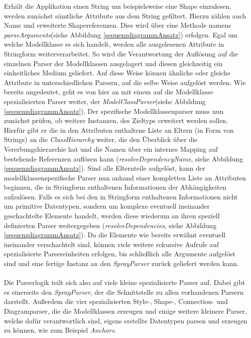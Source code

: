 \begin{figure}[htb]
\end{figure}Erhält die Applikation einen String um beispielsweise eine Shape einzulesen, werden zunächst sämtliche Attribute aus dem String gefiltert. Hierzu zählen auch Name und erweiterte Shapereferenzen. Dies wird über eine Methode namens \textit{parseArguments}(siehe Abbildung \ref{sequenzdiagrammAnsatz}) erfolgen. Egal um welche Modellklasse es sich handelt, werden alle ausgelesenen Attribute in Stringform weiterverarbeitet. So wird die Verantwortung der Auflösung auf die einzelnen Parser der Modellklassen ausgelagert und diesen gleichzeitig ein einheitliches Medium geliefert. Auf diese Weise können ähnliche oder gleiche Attribute in unterschiedlichen Parsern, auf die selbe Weise aufgelöst werden. Wie bereits angedeutet, geht es von hier an mit einem auf die Modellklasse spezialisierten Parser weiter, der \textit{ModelClassParser}(siehe Abbildung \ref{sequenzdiagrammAnsatz}). Der spezifische Modellklassenparser muss nun zunächst prüfen, ob weitere Instanzen, des Zieltyps erweitert werden sollen. Hierfür gibt er die in den Attributen enthaltene Liste an Eltern (in Form von Strings) an die \textit{ClassHierarchy} weiter, die den Überblick über die Vererbungshierarchie hat und die Namen über ein internes Mapping auf bestehende Referenzen auflösen kann (\textit{resolveDependencyName}, siehe Abbildung \ref{sequenzdiagrammAnsatz}). Sind alle Elternteile aufgelöst, kann der modellklassenspezifische Parser nun anhand einer kompletten Liste an Attributen beginnen, die in Stringform enthaltenen Informationen der Abhängigkeiten aufzulösen.
Falls es sich bei den in Stringform enthaltenen Informationen nicht um primitive Datentypen, sondern um komplexe eventuell ineinander geschachtelte Elemente handelt, werden diese wiederum an ihren speziell definierten Parser weitergegeben (\textit{resolveDependencies}, siehe Abbildung \ref{sequenzdiagrammAnsatz}). Da die Elemente wie bereits erwähnt eventuell ineinander verschachtelt sind, können viele weitere rekursive Aufrufe auf spezialisierte Parsereinheiten erfolgen, bis schließlich alle Argumente aufgelöst sind und eine fertige Instanz an den \textit{SprayParser} zurück geliefert werden kann.\\\\Die Parserlogik teilt sich also auf viele kleine spezialisierte Parser auf. Dabei gibt es einerseits den \textit{SprayParser}, der die Schnittstelle zu allen vorhandenen Parsern darstellt. Außerdem die vier spezialisierten Style-, Shape-, Connection- und Diagramparser, die die Modellklassen erzeugen und einige weitere kleinere Parser, welche dafür verantwortlich sind, eigens erstellte Datentypen parsen und erzeugen zu können, wie zum Beispiel \textit{Anchors}. 
